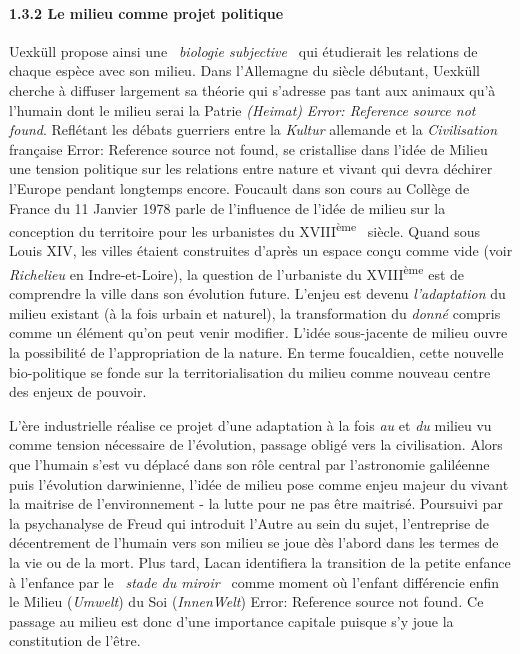 \paragraph[1.3.2 Le milieu comme projet politique]{1.3.2 Le milieu comme projet politique}
\hypertarget{RefHeading291699228146}{}{\sffamily\color{black}
Uexk\"ull propose ainsi une \textit{{\guillemotleft}~biologie subjective~{\guillemotright}} qui \'etudierait les
relations de chaque esp\`ece avec son milieu. Dans l'Allemagne du si\`ecle d\'ebutant, Uexk\"ull cherche \`a diffuser
largement sa th\'eorie qui s'adresse pas tant aux animaux qu'\`a l'humain dont le milieu serai la Patrie
\textit{(Heimat) }\textit{Error: Reference source not found}. Refl\'etant les d\'ebats guerriers entre la
\textit{Kultur} allemande et la \textit{Civilisation} fran\c{c}aise Error: Reference source not found, se cristallise
dans l'id\'ee de Milieu une tension politique sur les relations entre nature et vivant qui devra d\'echirer l'Europe
pendant longtemps encore. Foucault dans son cours au Coll\`ege de France du 11 Janvier 1978 parle de l'influence de
l'id\'ee de milieu sur la conception du territoire pour les urbanistes du XVIII\textsuperscript{\`eme} \ si\`ecle.
Quand sous Louis XIV, les villes \'etaient construites d'apr\`es un espace con\c{c}u comme vide (voir
\textit{Richelieu} en Indre-et-Loire), la question de l'urbaniste du XVIII\textsuperscript{\`eme} est de comprendre la
ville dans son \'evolution future. L'enjeu est devenu \textit{l'adaptation} du milieu existant (\`a la fois urbain et
naturel), la transformation du \textit{donn\'e }compris comme un \'el\'ement qu'on peut venir modifier\textit{.}
L'id\'ee sous-jacente de milieu ouvre la possibilit\'e de l'appropriation de la nature. En terme foucaldien, cette
nouvelle bio-politique se fonde sur la territorialisation du milieu comme nouveau centre des enjeux de pouvoir.}

{\sffamily\color{black}
L'\`ere industrielle r\'ealise ce projet d'une adaptation \`a la fois \textit{au }et \textit{du }milieu vu comme tension
n\'ecessaire de l'\'evolution, passage oblig\'e vers la civilisation. Alors que l'humain s'est vu d\'eplac\'e dans son
r\^ole central par l'astronomie galil\'eenne puis l'\'evolution darwinienne, l'id\'ee de milieu pose comme enjeu majeur
du vivant la maitrise de l'environnement - la lutte pour ne pas \^etre maitris\'e. Poursuivi par la psychanalyse de
Freud qui introduit l'Autre au sein du sujet, l{}'entreprise de d\'ecentrement de l'humain vers son milieu se joue
d\`es l'abord dans les termes de la vie ou de la mort. Plus tard, Lacan identifiera la transition de la petite enfance
\`a l'enfance par le \textit{{\guillemotleft}~}\textit{stade du miroir~{\guillemotright}} comme moment o\`u l'enfant
diff\'erencie enfin le Milieu (\textit{Umwelt}) du Soi (\textit{InnenWelt}) Error: Reference source not found\textit{.
}Ce {\textquotedbl}passage au milieu{\textquotedbl} est donc d'une importance capitale puisque s'y joue la constitution
de l'\^etre.}

